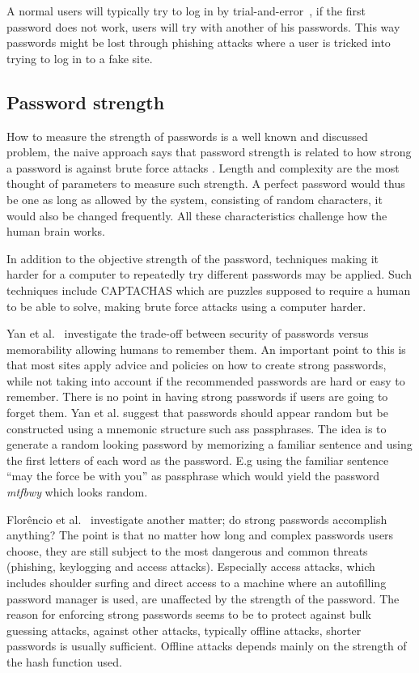 \par A normal users will typically try to log in by trial-and-error~\cite{single-pw-auth}, if the first password does not work, users will try with another of his passwords. This way passwords might be lost through phishing attacks where a user is tricked into trying to log in to a fake site. 

\subsection{Password strength}\label{password-strength}
How to measure the strength of passwords is a well known and discussed problem, the naive approach says that password strength is related to how strong a password is against brute force attacks \cite{password-strength}. Length and complexity are the most thought of parameters to measure such strength. A perfect password would thus be one as long as allowed by the system, consisting of random characters, it would also be changed frequently. All these characteristics challenge how the human brain works. 
\par In addition to the objective strength of the password, techniques making it harder for a computer to repeatedly try different passwords may be applied. Such techniques include CAPTACHAS \cite{captcha} which are puzzles supposed to require a human to be able to solve, making brute force attacks using a computer harder.
\par Yan et al.~\cite{memorability_yan} investigate the trade-off between security of passwords versus memorability allowing humans to remember them. An important point to this is that most sites apply advice and policies on how to create strong passwords, while not taking into account if the recommended passwords are hard or easy to remember. There is no point in having strong passwords if users are going to forget them. Yan et al. suggest that passwords should appear random but be constructed using a  mnemonic structure such ass passphrases. The idea is to generate a random looking password by memorizing a familiar sentence and using the first letters of each word as the password. E.g using the familiar sentence ``may the force be with you'' as passphrase which would yield the password \emph{mtfbwy} which looks random.
\par Florêncio et al.~\cite{strong-pws_florencio} investigate another matter; do strong passwords accomplish anything? The point is that no matter how long and complex passwords users choose, they are still subject to the most dangerous and common threats (phishing, keylogging and access attacks). Especially access attacks, which includes shoulder surfing and direct access to a machine where an autofilling password manager is used, are unaffected by the strength of the password.  The reason for enforcing strong passwords seems to be to protect against bulk guessing attacks, against other attacks, typically offline attacks, shorter passwords is usually sufficient. Offline attacks depends mainly on the strength of the hash function used.

